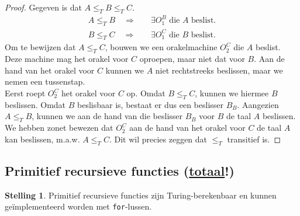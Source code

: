 \documentclass[kulak]{kulakarticle}
\theoremstyle{definition}
\newtheorem*{stelling}{Stelling}
\begin{document}
	\begin{proof} Gegeven is dat \(A \leq_T B \leq_T C\).
		\begin{align*}
			A \leq_T B \quad \Longrightarrow \quad &\exists O_1^B \text{ die $A$ beslist}.\\
			B \leq_T C \quad \Longrightarrow \quad &\exists O_1^C \text{ die $B$ beslist}.
		\end{align*}
		Om te bewijzen dat \(A \leq_T C\), bouwen we een orakelmachine \(O_2^C\) die \(A\) beslist. Deze machine mag het orakel voor \(C\) oproepen, maar niet dat voor \(B\). Aan de hand van het orakel voor \(C\) kunnen we \(A\) niet rechtstreeks beslissen, maar we nemen een tussenstap. \hfill \\

		Eerst roept \(O_2^C\) het orakel voor \(C\) op. Omdat \(B \leq_T C\), kunnen we hiermee \(B\) beslissen. Omdat \(B\) beslisbaar is, bestaat er dus een beslisser \(B_B\). Aangezien \(A \leq_T B\), kunnen we aan de hand van die beslisser \(B_B\) voor \(B\) de taal \(A\) beslissen. We hebben zonet bewezen dat \(O_2^C\) aan de hand van het orakel voor \(C\) de taal \(A\) kan beslissen, m.a.w. \(A \leq_T C\). Dit wil precies zeggen dat \(\leq_T\) transitief is.
	\end{proof}

	\subsection*{Primitief recursieve functies (\underline{totaal}!)}

	\begin{stelling}
		Primitief recursieve functies zijn Turing-berekenbaar en kunnen geïmplementeerd worden met \texttt{for}-lussen.
	\end{stelling}
\end{document}
